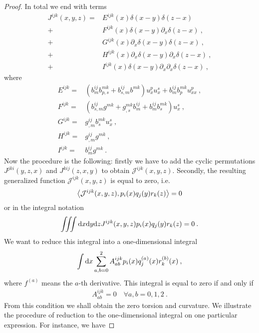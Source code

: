 \begin{proof}
    In total we end with terms
    \begin{align}
        J^{ijk}(x,y,z) =& 
        E^{ijk}(x) \delta(x-y) \delta(z-x) 
        \\+& F^{ijk}(x) \delta(x-y) \partial_x \delta(z-x) \:,
        \\+& G^{ijk}(x) \partial_x \delta(x-y) \delta (z-x) \:,
        \\+& H^{ijk}(x) \partial_x \delta(x-y) \partial_x \delta (z-x) \:,
        \\+& I^{ijk}(x) \delta(x-y) \partial_x \partial_x \delta (z-x) \:,
    \end{align}
    where
    \begin{align}
        E^{ijk} =& (b^{ij}_m b^{mk}_{p,s} + b^{ij}_{s,m} b^{mk} ) u^p_x u^s_x + b^{ij}_m b^{mk}_p u^p_{xx} \:, \\
        F^{ijk} =& (b^{ij}_{s,m} g^{mk} + g^{mk}_{,s} b^{ij}_m + b^{ij}_m b^{mk}_s)u_x^s \:, \\
        G^{ijk} =& g^{ij}_{,m} b^{mk}_s u^s_x \:,\\
        H^{ijk} =& g^{ij}_{,m} g^{mk} \:,\\
        I^{ijk} =& b^{ij}_m g^{mk} \:.
    \end{align}
    Now the procedure is the following: firstly we have to add the cyclic permutations $J^{jki}(y,z,x)$ and $J^{kij}(z,x,y)$ to obtain $\mathcal J^{ijk}(x,y,z)$. Secondly, the resulting generalized function $\mathcal J^{ijk}(x,y,z)$ is equal to zero, i.e.
    \begin{align}
        \left \langle \mathcal J^{ijk}(x,y,z) ,p_i(x)q_j(y)r_k(z) \right \rangle = 0
    \end{align}
    or in the integral notation 
    \begin{align}
        \iiint \mathrm{d} x \mathrm{d} y \mathrm{d} z J^{ijk}(x,y,z) p_i(x)q_j(y)r_k(z) = 0 \:.
    \end{align}
    We want to reduce this integral into a one-dimensional integral
    \begin{align}
        \int \mathrm{d} x \sum_{a,b = 0}^2 A^{ijk}_{ab} p_i(x) q^{(a)}_j(x) r^{(b)}_k (x) \:,
    \end{align}
    where $f^{(a)}$ means the $a$-th derivative. This integral is equal to zero if and only if
    \begin{align}
        A^{ijk}_{ab} = 0 \quad \forall a,b = 0,1,2 \:.
    \end{align}
    From this condition we shall obtain the zero torsion and curvature.
    We illustrate the procedure of reduction to the one-dimensional integral on one particular expression. For instance, we have

\end{proof}
